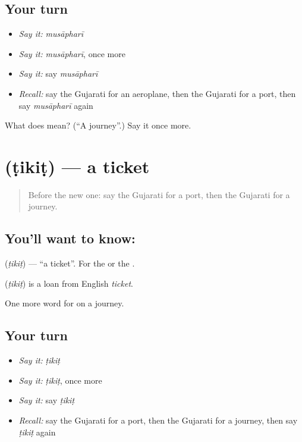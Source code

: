 \subsection*{Your turn}
\begin{itemize}
\raggedright
  \item \emph{Say it:} \emph{musāpharī}
  \item \emph{Say it:} \emph{musāpharī}, once more
  \item \emph{Say it:} say \emph{musāpharī}
  \item \emph{Recall:} say the Gujarati for an aeroplane, then the Gujarati for a port, then say \emph{musāpharī} again
\end{itemize}

\begin{tcolorbox}[breakable,colback=teal!4,colframe=teal!35!black,title={Before you move on}]
What does  mean? (\textquotedblleft{}A journey\textquotedblright{}.) Say it once more.
\end{tcolorbox}
\section[\texorpdfstring{\gu{ટિકિટ} (ṭikiṭ)}{ટિકિટ (ṭikiṭ)}]{ (ṭikiṭ) — a ticket}

\label{lesson:GU-C86-ticket}



\begin{quote}
Before the new one: say the Gujarati for a port, then the Gujarati for a journey.
\end{quote}

\subsection*{You'll want to know: }
\textbf{} (\emph{ṭikiṭ}) — \textquotedblleft{}a ticket\textquotedblright{}. For the \textbf{} or the \textbf{}.

\begin{cousinweb}
\textbf{} (\emph{ṭikiṭ}) is a loan from English \emph{ticket}.
\end{cousinweb}

\begin{grammarlens}[title={What you've built}]
One more word for on a journey.
\end{grammarlens}

\subsection*{Your turn}
\begin{itemize}
\raggedright
  \item \emph{Say it:} \emph{ṭikiṭ}
  \item \emph{Say it:} \emph{ṭikiṭ}, once more
  \item \emph{Say it:} say \emph{ṭikiṭ}
  \item \emph{Recall:} say the Gujarati for a port, then the Gujarati for a journey, then say \emph{ṭikiṭ} again
\end{itemize}

